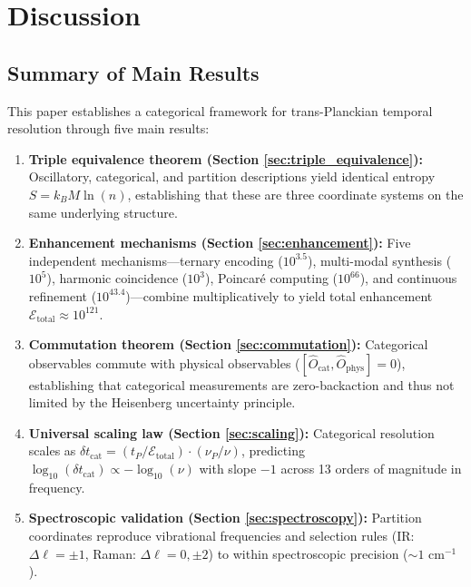 \documentclass[twocolumn,10pt]{article}
\theoremstyle{remark}
\begin{document}
\section{Discussion}
\label{sec:discussion}

\subsection{Summary of Main Results}

This paper establishes a categorical framework for trans-Planckian temporal resolution through five main results:

\begin{enumerate}
    \item \textbf{Triple equivalence theorem (Section \ref{sec:triple_equivalence}):} Oscillatory, categorical, and partition descriptions yield identical entropy $S = k_B M \ln(n)$, establishing that these are three coordinate systems on the same underlying structure.

    \item \textbf{Enhancement mechanisms (Section \ref{sec:enhancement}):} Five independent mechanisms—ternary encoding ($10^{3.5}$), multi-modal synthesis ($10^{5}$), harmonic coincidence ($10^{3}$), Poincaré computing ($10^{66}$), and continuous refinement ($10^{43.4}$)—combine multiplicatively to yield total enhancement $\mathcal{E}_{\text{total}} \approx 10^{121}$.

    \item \textbf{Commutation theorem (Section \ref{sec:commutation}):} Categorical observables commute with physical observables ($[\hat{O}_{\text{cat}}, \hat{O}_{\text{phys}}] = 0$), establishing that categorical measurements are zero-backaction and thus not limited by the Heisenberg uncertainty principle.

    \item \textbf{Universal scaling law (Section \ref{sec:scaling}):} Categorical resolution scales as $\delta t_{\text{cat}} = (t_P/\mathcal{E}_{\text{total}}) \cdot (\nu_P/\nu)$, predicting $\log_{10}(\delta t_{\text{cat}}) \propto -\log_{10}(\nu)$ with slope $-1$ across 13 orders of magnitude in frequency.

    \item \textbf{Spectroscopic validation (Section \ref{sec:spectroscopy}):} Partition coordinates reproduce vibrational frequencies and selection rules (IR: $\Delta \ell = \pm 1$, Raman: $\Delta \ell = 0, \pm 2$) to within spectroscopic precision ($\sim 1$ cm$^{-1}$).
\end{enumerate}
\end{document}
